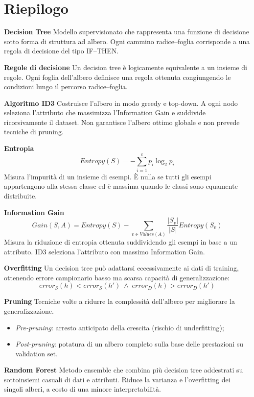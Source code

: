 \documentclass[a4paper,12pt]{report}
\begin{document}
\newpage
\section*{Riepilogo}

\begin{tcolorbox}[
    colback=green!10,
    colframe=green!50!black,
    boxrule=0.4pt,
    left=6pt,
    right=6pt,
    top=6pt,
    bottom=6pt,
    breakable
]

\textbf{Decision Tree}  
Modello supervisionato che rappresenta una funzione di decisione sotto forma di struttura ad albero.
Ogni cammino radice--foglia corrisponde a una regola di decisione del tipo IF--THEN.

\medskip
\textbf{Regole di decisione}  
Un decision tree è logicamente equivalente a un insieme di regole.
Ogni foglia dell’albero definisce una regola ottenuta congiungendo le condizioni lungo il percorso radice--foglia.

\medskip
\textbf{Algoritmo ID3}  
Costruisce l’albero in modo greedy e top-down.
A ogni nodo seleziona l’attributo che massimizza l’Information Gain e suddivide ricorsivamente il dataset.
Non garantisce l’albero ottimo globale e non prevede tecniche di pruning.

\medskip
\textbf{Entropia}
\[
Entropy(S) = - \sum_{i=1}^{c} p_i \log_2 p_i
\]
Misura l’impurità di un insieme di esempi.
È nulla se tutti gli esempi appartengono alla stessa classe ed è massima quando le classi sono equamente distribuite.

\medskip
\textbf{Information Gain}
\[
Gain(S,A) = Entropy(S) - \sum_{v \in Values(A)} \frac{|S_v|}{|S|} Entropy(S_v)
\]
Misura la riduzione di entropia ottenuta suddividendo gli esempi in base a un attributo.
ID3 seleziona l’attributo con massimo Information Gain.

\medskip
\textbf{Overfitting}
Un decision tree può adattarsi eccessivamente ai dati di training, ottenendo errore campionario basso ma scarsa capacità di generalizzazione:
\[
error_S(h) < error_S(h') \;\land\; error_D(h) > error_D(h')
\]

\medskip
\textbf{Pruning}  
Tecniche volte a ridurre la complessità dell’albero per migliorare la generalizzazione.
\begin{itemize}
    \item \textit{Pre-pruning}: arresto anticipato della crescita (rischio di underfitting);
    \item \textit{Post-pruning}: potatura di un albero completo sulla base delle prestazioni su validation set.
\end{itemize}

\medskip
\textbf{Random Forest}  
Metodo ensemble che combina più decision tree addestrati su sottoinsiemi casuali di dati e attributi.
Riduce la varianza e l’overfitting dei singoli alberi, a costo di una minore interpretabilità.

\end{tcolorbox}
\end{document}
